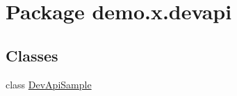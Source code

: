 \hypertarget{namespacedemo_1_1x_1_1devapi}{}\section{Package demo.\+x.\+devapi}
\label{namespacedemo_1_1x_1_1devapi}
\subsection*{Classes}
\begin{DoxyCompactItemize}
\item 
class \mbox{\hyperlink{classdemo_1_1x_1_1devapi_1_1_dev_api_sample}{Dev\+Api\+Sample}}
\end{DoxyCompactItemize}

